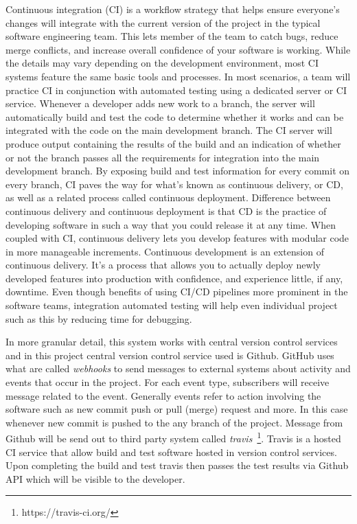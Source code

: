 Continuous integration (CI) is a workflow strategy that helps ensure everyone's changes will integrate with the current version of the project in the typical software engineering team. This lets member of the team to catch bugs, reduce merge conflicts, and increase overall confidence of your software is working. While the details may vary depending on the development environment, most CI systems feature the same basic tools and processes. In most scenarios, a team will practice CI in conjunction with automated testing using a dedicated server or CI service. Whenever a developer adds new work to a branch, the server will automatically build and test the code to determine whether it works and can be integrated with the code on the main development branch. The CI server will produce output containing the results of the build and an indication of whether or not the branch passes all the requirements for integration into the main development branch. By exposing build and test information for every commit on every branch, CI paves the way for what's known as continuous delivery, or CD, as well as a related process called continuous deployment. Difference between continuous delivery and continuous deployment is that CD is the practice of developing software in such a way that you could release it at any time. When coupled with CI, continuous delivery lets you develop features with modular code in more manageable increments. Continuous development is an extension of continuous delivery. It's a process that allows you to actually deploy newly developed features into production with confidence, and experience little, if any, downtime. Even though benefits of using CI/CD pipelines more prominent in the software teams, integration automated testing will help even individual project such as this by reducing time for debugging.

In more granular detail, this system works with central version control services and in this project central version control service used is Github. GitHub uses what are called \emph{webhooks} to send messages to external systems about activity and events that occur in the project. For each event type, subscribers will receive message related to the event. Generally events refer to action involving the software such as new commit push or pull (merge) request and more. In this case whenever new commit is pushed to the any branch of the project. Message from Github will be send out to third party system called \emph{travis}~\footnote{https://travis-ci.org/}. Travis is a hosted CI service that allow build and test software hosted in version control services. Upon completing the build and test travis then passes the test results via Github API which will be visible to the developer. 

